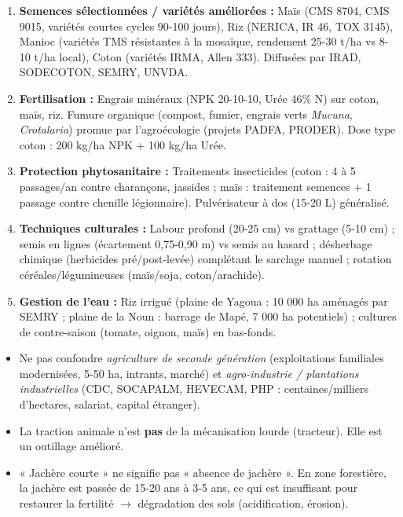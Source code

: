 \documentclass[11pt]{article}
\begin{document}
\begin{methode}
\begin{enumerate}
\item \textbf{Semences sélectionnées / variétés améliorées :} Maïs (CMS 8704, CMS 9015, variétés courtes cycles 90-100 jours), Riz (NERICA, IR 46, TOX 3145), Manioc (variétés TMS résistantes à la mosaïque, rendement 25-30 t/ha vs 8-10 t/ha local), Coton (variétés IRMA, Allen 333). Diffusées par IRAD, SODECOTON, SEMRY, UNVDA.
\item \textbf{Fertilisation :} Engrais minéraux (NPK 20-10-10, Urée 46\% N) sur coton, maïs, riz. Fumure organique (compost, fumier, engrais verts \emph{Mucuna}, \emph{Crotalaria}) promue par l'agroécologie (projets PADFA, PRODER). Dose type coton : 200 kg/ha NPK + 100 kg/ha Urée.
\item \textbf{Protection phytosanitaire :} Traitements insecticides (coton : 4 à 5 passages/an contre charançons, jassides ; maïs : traitement semences + 1 passage contre chenille légionnaire). Pulvérisateur à dos (15-20 L) généralisé.
\item \textbf{Techniques culturales :} Labour profond (20-25 cm) vs grattage (5-10 cm) ; semis en lignes (écartement 0,75-0,90 m) vs semis au hasard ; désherbage chimique (herbicides pré/post-levée) complétant le sarclage manuel ; rotation céréales/légumineuses (maïs/soja, coton/arachide).
\item \textbf{Gestion de l'eau :} Riz irrigué (plaine de Yagoua : 10 000 ha aménagés par SEMRY ; plaine de la Noun : barrage de Mapé, 7 000 ha potentiels) ; cultures de contre-saison (tomate, oignon, maïs) en bas-fonds.
\end{enumerate}
\end{methode}

\begin{attention}
\begin{itemize}
\item Ne pas confondre \emph{agriculture de seconde génération} (exploitations familiales modernisées, 5-50 ha, intrants, marché) et \emph{agro-industrie / plantations industrielles} (CDC, SOCAPALM, HEVECAM, PHP : centaines/milliers d'hectares, salariat, capital étranger).
\item La traction animale n'est \textbf{pas} de la mécanisation lourde (tracteur). Elle est un outillage amélioré.
\item « Jachère courte » ne signifie pas « absence de jachère ». En zone forestière, la jachère est passée de 15-20 ans à 3-5 ans, ce qui est insuffisant pour restaurer la fertilité $\rightarrow$ dégradation des sols (acidification, érosion).
\end{itemize}
\end{attention}
\end{document}
